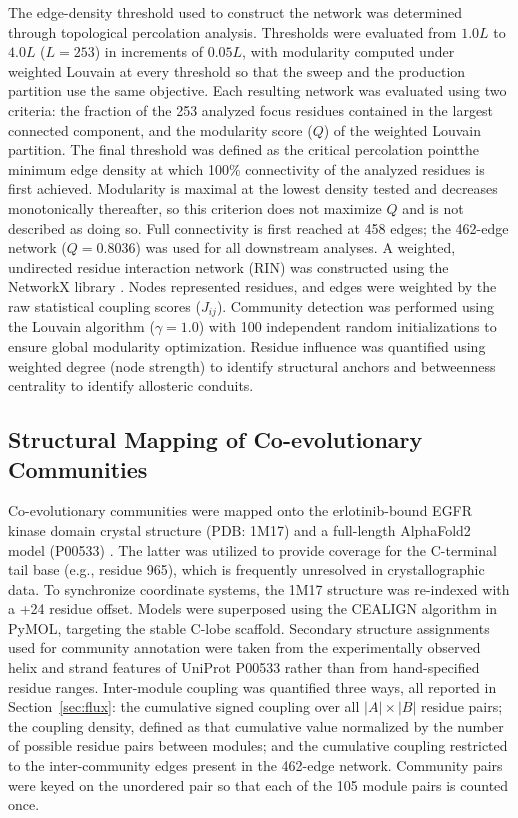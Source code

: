 \documentclass[utf8]{FrontiersinHarvard}
\begin{document}
The edge-density threshold used to construct the network was determined through topological percolation analysis. Thresholds were evaluated from $1.0L$ to $4.0L$ ($L=253$) in increments of $0.05L$, with modularity computed under weighted Louvain at every threshold so that the sweep and the production partition use the same objective. Each resulting network was evaluated using two criteria: the fraction of the 253 analyzed focus residues contained in the largest connected component, and the modularity score ($Q$) of the weighted Louvain partition. The final threshold was defined as the critical percolation point\textemdash the minimum edge density at which 100\% connectivity of the analyzed residues is first achieved. Modularity is maximal at the lowest density tested and decreases monotonically thereafter, so this criterion does not maximize $Q$ and is not described as doing so. Full connectivity is first reached at 458 edges; the 462-edge network ($Q=0.8036$) was used for all downstream analyses. A weighted, undirected residue interaction network (RIN) was constructed using the NetworkX library \citep{Hagberg2008}. Nodes represented residues, and edges were weighted by the raw statistical coupling scores ($J_{ij}$). Community detection was performed using the Louvain algorithm \citep{Blondel2008} ($\gamma=1.0$) with 100 independent random initializations to ensure global modularity optimization. Residue influence was quantified using weighted degree (node strength) to identify structural anchors and betweenness centrality to identify allosteric conduits.

\subsection{Structural Mapping of Co-evolutionary Communities}

Co-evolutionary communities were mapped onto the erlotinib-bound EGFR kinase domain crystal structure (PDB: 1M17) \citep{Stamos2002} and a full-length AlphaFold2 model (P00533) \citep{Jumper2021}. The latter was utilized to provide coverage for the C-terminal tail base (e.g., residue 965), which is frequently unresolved in crystallographic data. To synchronize coordinate systems, the 1M17 structure was re-indexed with a +24 residue offset. Models were superposed using the CEALIGN algorithm \citep{ShindyalovBourne1998} in PyMOL, targeting the stable C-lobe scaffold. Secondary structure assignments used for community annotation were taken from the experimentally observed helix and strand features of UniProt P00533 rather than from hand-specified residue ranges. Inter-module coupling was quantified three ways, all reported in Section~\ref{sec:flux}: the cumulative signed coupling over all $|A| \times |B|$ residue pairs; the coupling density, defined as that cumulative value normalized by the number of possible residue pairs between modules; and the cumulative coupling restricted to the inter-community edges present in the 462-edge network. Community pairs were keyed on the unordered pair so that each of the 105 module pairs is counted once.
\end{document}
